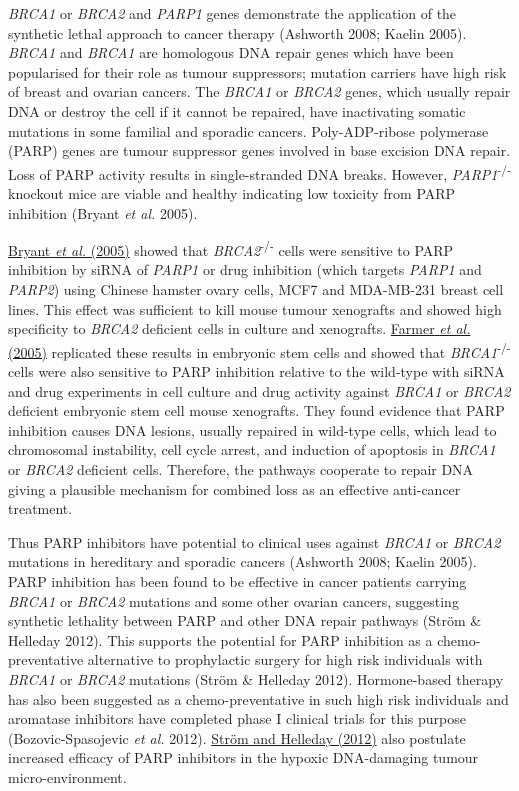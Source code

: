\textit{BRCA1} or \textit{BRCA2} and \textit{PARP1} genes demonstrate the application of the synthetic lethal approach to cancer therapy (Ashworth 2008; Kaelin 2005). \textit{BRCA1} and \textit{BRCA1} are homologous DNA repair genes which have been popularised for their role as tumour suppressors; mutation carriers have high risk of breast and ovarian cancers. The \textit{BRCA1} or \textit{BRCA2} genes, which usually repair DNA or destroy the cell if it cannot be repaired, have inactivating somatic mutations in some familial and sporadic cancers. Poly-ADP-ribose polymerase (PARP) genes are tumour suppressor genes involved in base excision DNA repair. Loss of PARP activity results in single-stranded DNA breaks. However, \textit{PARP1}\textsuperscript{-/-} knockout mice are viable and healthy indicating low toxicity from PARP inhibition (Bryant\textit{ et al.} 2005).  

\hyperlink{ENREF19}{Bryant}\hyperlink{ENREF19}{\textit{ et al.}}\hyperlink{ENREF19}{ (2005)} showed that \textit{BRCA2}\textsuperscript{{}-/-} cells were sensitive to PARP inhibition by siRNA of \textit{PARP1} or drug inhibition (which targets \textit{PARP1} and \textit{PARP2}) using Chinese hamster ovary cells, MCF7 and MDA-MB-231 breast cell lines. This effect was sufficient to kill mouse tumour xenografts and showed high specificity to \textit{BRCA2} deficient cells in culture and xenografts. \hyperlink{ENREF39}{Farmer}\hyperlink{ENREF39}{\textit{ et al.}}\hyperlink{ENREF39}{ (2005)} replicated these results in embryonic stem cells and showed that \textit{BRCA1}\textsuperscript{{}-/-} cells were also sensitive to PARP inhibition relative to the wild-type with siRNA and drug experiments in cell culture and drug activity against \textit{BRCA1} or \textit{BRCA2} deficient embryonic stem cell mouse xenografts. They found evidence that PARP inhibition causes DNA lesions, usually repaired in wild-type cells, which lead to chromosomal instability, cell cycle arrest, and induction of apoptosis in \textit{BRCA1} or \textit{BRCA2} deficient cells. Therefore, the pathways cooperate to repair DNA giving a plausible mechanism for combined loss as an effective anti-cancer treatment.  

Thus PARP inhibitors have potential to clinical uses against \textit{BRCA1} or \textit{BRCA2} mutations in hereditary and sporadic cancers (Ashworth 2008; Kaelin 2005). PARP inhibition has been found to be effective in cancer patients carrying \textit{BRCA1} or \textit{BRCA2} mutations and some other ovarian cancers, suggesting synthetic lethality between PARP and other DNA repair pathways (Str\"om \& Helleday 2012). This supports the potential for PARP inhibition as a chemo-preventative alternative to prophylactic surgery for high risk individuals with \textit{BRCA1} or \textit{BRCA2} mutations (Str\"om \& Helleday 2012). Hormone-based therapy has also been suggested as a chemo-preventative in such high risk individuals and aromatase inhibitors have completed phase I clinical trials for this purpose (Bozovic-Spasojevic\textit{ et al.} 2012). \hyperlink{ENREF91}{Str\"om and Helleday (2012)} also postulate increased efficacy of PARP inhibitors in the hypoxic DNA-damaging tumour micro-environment.  

